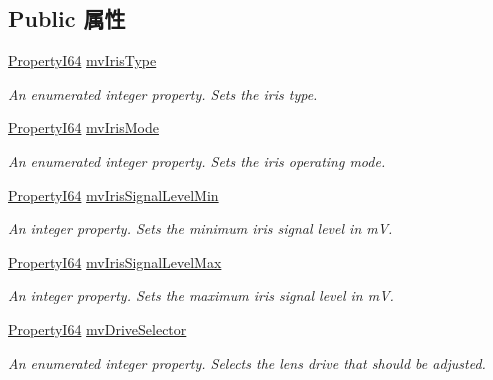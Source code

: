 \subsection*{Public 属性}
\begin{DoxyCompactItemize}
\item 
\hyperlink{group___common_interface_ga81749b2696755513663492664a18a893}{Property\+I64} \hyperlink{classmv_i_m_p_a_c_t_1_1acquire_1_1_gen_i_cam_1_1mv_lens_control_a21b42a21cab10d159c5283452a8489f5}{mv\+Iris\+Type}
\begin{DoxyCompactList}\small\item\em An enumerated integer property. Sets the iris type. \end{DoxyCompactList}\item 
\hyperlink{group___common_interface_ga81749b2696755513663492664a18a893}{Property\+I64} \hyperlink{classmv_i_m_p_a_c_t_1_1acquire_1_1_gen_i_cam_1_1mv_lens_control_a1838326a8bf847b4a99580a519bcd13f}{mv\+Iris\+Mode}
\begin{DoxyCompactList}\small\item\em An enumerated integer property. Sets the iris operating mode. \end{DoxyCompactList}\item 
\hyperlink{group___common_interface_ga81749b2696755513663492664a18a893}{Property\+I64} \hyperlink{classmv_i_m_p_a_c_t_1_1acquire_1_1_gen_i_cam_1_1mv_lens_control_aaf7d5f46be0aeb8d7ed468bff4145d64}{mv\+Iris\+Signal\+Level\+Min}
\begin{DoxyCompactList}\small\item\em An integer property. Sets the minimum iris signal level in m\+V. \end{DoxyCompactList}\item 
\hyperlink{group___common_interface_ga81749b2696755513663492664a18a893}{Property\+I64} \hyperlink{classmv_i_m_p_a_c_t_1_1acquire_1_1_gen_i_cam_1_1mv_lens_control_ac71d9986da32f2f6cbe2922876262651}{mv\+Iris\+Signal\+Level\+Max}
\begin{DoxyCompactList}\small\item\em An integer property. Sets the maximum iris signal level in m\+V. \end{DoxyCompactList}\item 
\hyperlink{group___common_interface_ga81749b2696755513663492664a18a893}{Property\+I64} \hyperlink{classmv_i_m_p_a_c_t_1_1acquire_1_1_gen_i_cam_1_1mv_lens_control_abeff1f248c0200b0055f09b9c52f6eb8}{mv\+Drive\+Selector}
\begin{DoxyCompactList}\small\item\em An enumerated integer property. Selects the lens drive that should be adjusted. \end{DoxyCompactList}\item 

\end{DoxyCompactItemize}

